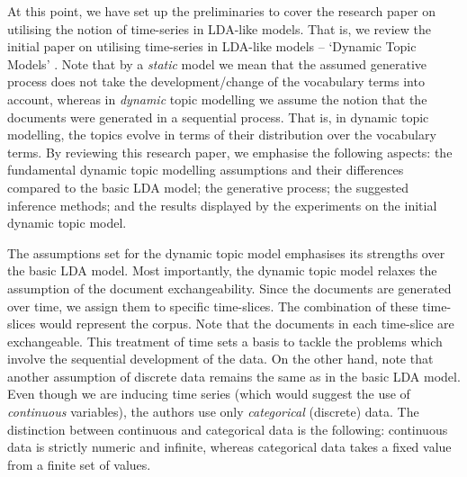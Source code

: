 \documentclass{mprop}
\begin{document}
\par At this point, we have set up the preliminaries to cover the research paper on utilising the notion of time-series in LDA-like models. That is, we review the initial paper on utilising time-series in LDA-like models -- `Dynamic Topic Models' \cite{blei_2006}. Note that by a \textit{static} model we mean that the assumed generative process does not take the development/change of the vocabulary terms into account, whereas in \textit{dynamic} topic modelling we assume the notion that the documents were generated in a sequential process. That is, in dynamic topic modelling, the topics evolve in terms of their distribution over the vocabulary terms. By reviewing this research paper, we emphasise the following aspects: the fundamental dynamic topic modelling assumptions and their differences compared to the basic LDA model; the generative process; the suggested inference methods; and the results displayed by the experiments on the initial dynamic topic model.

\par The assumptions set for the dynamic topic model emphasises its strengths over the basic LDA model. Most importantly, the dynamic topic model relaxes the assumption of the document exchangeability. Since the documents are generated over time, we assign them to specific time-slices. The combination of these time-slices would represent the corpus. Note that the documents in each time-slice are exchangeable. This treatment of time sets a basis to tackle the problems which involve the sequential development of the data. On the other hand, note that another assumption of discrete data remains the same as in the basic LDA model. Even though we are inducing time series (which would suggest the use of \textit{continuous} variables), the authors use only \textit{categorical} (discrete) data. The distinction between continuous and categorical data is the following: continuous data is strictly numeric and infinite, whereas categorical data takes a fixed value from a finite set of values. 
\end{document}
